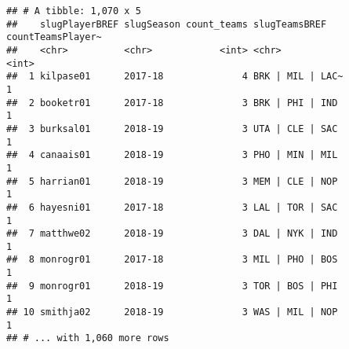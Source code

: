 \documentclass[]{article}
\newenvironment{Shaded}{\begin{snugshade}}{\end{snugshade}}
\newcommand{\KeywordTok}[1]{\textcolor[rgb]{0.13,0.29,0.53}{\textbf{#1}}}
\newcommand{\DataTypeTok}[1]{\textcolor[rgb]{0.13,0.29,0.53}{#1}}
\newcommand{\StringTok}[1]{\textcolor[rgb]{0.31,0.60,0.02}{#1}}
\newcommand{\CommentTok}[1]{\textcolor[rgb]{0.56,0.35,0.01}{\textit{#1}}}
\newcommand{\OperatorTok}[1]{\textcolor[rgb]{0.81,0.36,0.00}{\textbf{#1}}}
\newcommand{\NormalTok}[1]{#1}
\begin{document}
\begin{Shaded}
\end{Shaded}

\begin{verbatim}
## # A tibble: 1,070 x 5
##    slugPlayerBREF slugSeason count_teams slugTeamsBREF    countTeamsPlayer~
##    <chr>          <chr>            <int> <chr>                        <int>
##  1 kilpase01      2017-18              4 BRK | MIL | LAC~                 1
##  2 booketr01      2017-18              3 BRK | PHI | IND                  1
##  3 burksal01      2018-19              3 UTA | CLE | SAC                  1
##  4 canaais01      2018-19              3 PHO | MIN | MIL                  1
##  5 harrian01      2018-19              3 MEM | CLE | NOP                  1
##  6 hayesni01      2017-18              3 LAL | TOR | SAC                  1
##  7 matthwe02      2018-19              3 DAL | NYK | IND                  1
##  8 monrogr01      2017-18              3 MIL | PHO | BOS                  1
##  9 monrogr01      2018-19              3 TOR | BOS | PHI                  1
## 10 smithja02      2018-19              3 WAS | MIL | NOP                  1
## # ... with 1,060 more rows
\end{verbatim}
\end{document}
